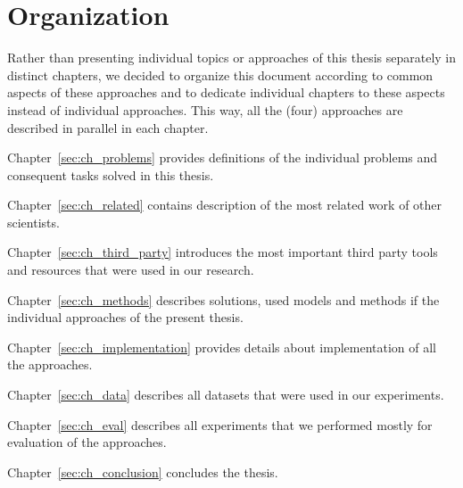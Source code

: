 \section{Organization}

Rather than presenting individual topics or approaches of this thesis separately in distinct chapters, we decided to organize this document according to common aspects of these approaches and to dedicate individual chapters to these aspects instead of individual approaches. This way, all the (four) approaches are described in parallel in each chapter. 

Chapter~\ref{sec:ch_problems} provides definitions of the individual problems and consequent tasks solved in this thesis.

Chapter~\ref{sec:ch_related} contains description of the most related work of other scientists.

Chapter~\ref{sec:ch_third_party} introduces the most important third party tools and resources that were used in our research.

Chapter~\ref{sec:ch_methods} describes solutions, used models and methods if the individual approaches of the present thesis.

Chapter~\ref{sec:ch_implementation} provides details about implementation of all the approaches.

Chapter~\ref{sec:ch_data} describes all datasets that were used in our experiments.

Chapter~\ref{sec:ch_eval} describes all experiments that we performed mostly for evaluation of the approaches.

Chapter~\ref{sec:ch_conclusion} concludes the thesis.

